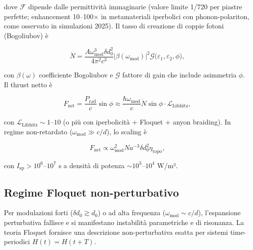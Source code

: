 \documentclass[11pt,a4paper]{article}
\theoremstyle{plain}
\theoremstyle{definition}
\begin{document}
\vspace{0.3cm}

dove $\mathcal{F}$ dipende dalle permittività immaginarie (valore limite 1/720 per piastre perfette; enhancement 10–100× in metamateriali iperbolici con phonon-polariton, come osservato in simulazioni 2025). Il tasso di creazione di coppie fotoni (Bogoliubov) è

\begin{equation}
\dot{N} = \frac{A \omega_{\mathrm{mod}}^3 \delta d_0^2}{4\pi^2 c^3} \left| \beta(\omega_{\mathrm{mod}}) \right|^2 \mathcal{G}\bigl(\varepsilon_1, \varepsilon_2, \phi\bigr),
\label{eq:bogoliubov-rate}
\end{equation}

\vspace{0.3cm}

con $\beta(\omega)$ coefficiente Bogoliubov e $\mathcal{G}$ fattore di gain che include asimmetria $\phi$. Il thrust netto è

\begin{equation}
F_{\mathrm{net}} = \frac{P_{\mathrm{rad}}}{c} \sin\phi \approx \frac{\hbar \omega_{\mathrm{mod}}}{c} \dot{N} \sin\phi \cdot \mathcal{L}_{\mathrm{Lifshitz}},
\label{eq:thrust-lifshitz}
\end{equation}

con $\mathcal{L}_{\mathrm{Lifshitz}} \sim 1$--$10$ (o più con iperbolicità + Floquet + anyon braiding). In regime non-retardato ($\omega_{\mathrm{mod}} \gg c/d$), lo scaling è

\begin{equation}
F_{\mathrm{net}} \propto \omega_{\mathrm{mod}}^2 N a^{-3} \delta d_0^2 \eta_{\mathrm{topo}},
\label{eq:lifshitz-scaling}
\end{equation}

con $I_{\mathrm{sp}} > 10^6$--$10^7$ s a densità di potenza $\sim 10^3$--$10^4$ W/m².


\clearpage

\subsection{Regime Floquet non-perturbativo}

Per modulazioni forti ($\delta d_0 \gtrsim d_0$) o ad alta frequenza ($\omega_{\mathrm{mod}} \sim c/d$), l'espansione perturbativa fallisce e si manifestano instabilità parametriche e di risonanza. La teoria Floquet fornisce una descrizione non-perturbativa esatta per sistemi time-periodici $H(t) = H(t+T)$.
\end{document}

